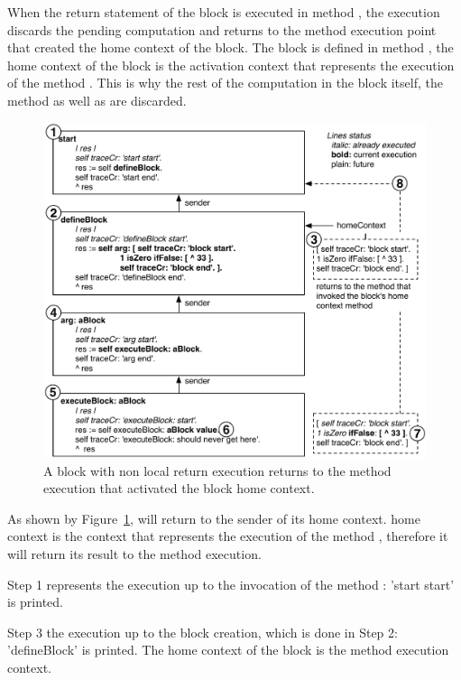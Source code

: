 \documentclass[a4paper,10pt,twoside]{book}
\begin{document}
When the return statement of the block is executed in method , the execution discards the pending computation and returns to the method execution point that created the home context of the block. The block is defined in  method , the home context of the block is the activation context that represents the execution of the method . This is why the rest of the computation in the block itself, the  method as well as  are discarded.

\begin{figure}[!h]
\begin{center}\includegraphics[width=\textwidth]{nonLocalReturn2}
\caption{A block with non local return execution returns to the method execution that activated the block home context.\label{nonLocalReturn}}
\end{center}
\end{figure}

As shown by Figure~\ref{nonLocalReturn}, \ct{[^33]} will return to the sender of its home context. \ct{[^33]} home context is the context that represents the execution of the method , therefore it will return its result to the method  execution.

Step 1 represents the execution up to the invocation of the method : 'start start' is printed.

Step 3 the execution up to the block creation, which is done in Step 2: 'defineBlock' is printed. The home context of the block is the  method execution context.
\end{document}
